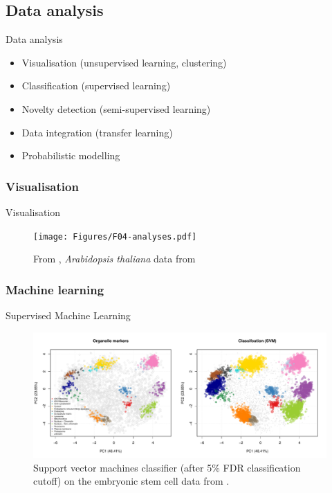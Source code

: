 \subsection*{Data analysis}
\label{sec:comp}


\begin{frame}{Data analysis}
  \begin{itemize}
  \item Visualisation (unsupervised learning, clustering) \citep{Gatto:2018}
  \item Classification (supervised learning) \citep{Breckels:2016b}
  \item Novelty detection (semi-supervised learning) \cite{Breckels:2013}
  \item Data integration (transfer learning) \citep{Breckels:2016}
  \item Probabilistic modelling \citep{Crook:2018}
  \end{itemize}
\end{frame}



\subsubsection*{Visualisation}
\label{sec:viz}

\begin{frame}{Visualisation}
  \begin{figure}
    \centering
    \texttt{[image: Figures/F04-analyses.pdf]}
    \caption{From \cite{Gatto:2010}, \textit{Arabidopsis thaliana} data
      from \cite{Dunkley:2006}}
  \end{figure}
\end{frame}

\subsubsection*{Machine learning}
\label{sec:ml}


\begin{frame}{Supervised Machine Learning}
  \begin{figure}[h]
    \centering
    \includegraphics[width=\linewidth]{figs_local/hyperlopit-class.pdf}
    \caption{Support vector machines classifier (after 5\% FDR
      classification cutoff) on the embryonic stem cell data from
      \cite{Christoforou:2016}.}
  \end{figure}
\end{frame}


